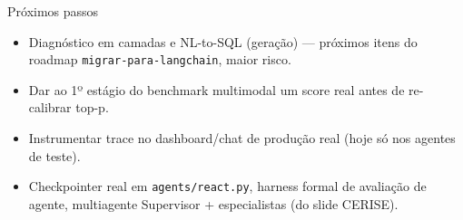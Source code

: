 \documentclass{beamer}
\begin{document}
\begin{frame}{Próximos passos}
  \begin{itemize}
    \item Diagnóstico em camadas e NL-to-SQL (geração) — próximos itens do roadmap
      \texttt{migrar-para-langchain}, maior risco.
    \item Dar ao 1º estágio do benchmark multimodal um score real antes de re-calibrar
      top-p.
    \item Instrumentar trace no dashboard/chat de produção real (hoje só nos agentes
      de teste).
    \item Checkpointer real em \texttt{agents/react.py}, harness formal de avaliação de
      agente, multiagente Supervisor + especialistas (do slide CERISE).
  \end{itemize}
\end{frame}
\end{document}

